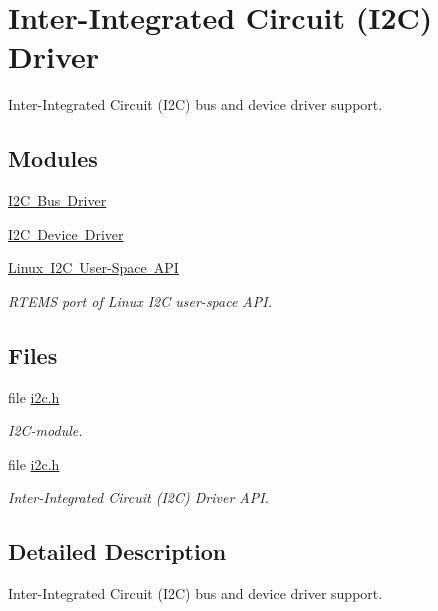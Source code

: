 \hypertarget{group__I2C}{}\section{Inter-\/\+Integrated Circuit (I2C) Driver}
\label{group__I2C}


Inter-\/\+Integrated Circuit (I2C) bus and device driver support.  


\subsection*{Modules}
\begin{DoxyCompactItemize}
\item 
\mbox{\hyperlink{group__I2CBus}{I2\+C Bus Driver}}
\item 
\mbox{\hyperlink{group__I2CDevice}{I2\+C Device Driver}}
\item 
\mbox{\hyperlink{group__I2CLinux}{Linux I2\+C User-\/\+Space A\+PI}}
\begin{DoxyCompactList}\small\item\em R\+T\+E\+MS port of Linux I2C user-\/space A\+PI. \end{DoxyCompactList}\end{DoxyCompactItemize}
\subsection*{Files}
\begin{DoxyCompactItemize}
\item 
file \mbox{\hyperlink{bsps_2arm_2stm32f4_2include_2bsp_2i2c_8h}{i2c.\+h}}
\begin{DoxyCompactList}\small\item\em I2\+C-\/module. \end{DoxyCompactList}\item 
file \mbox{\hyperlink{cpukit_2include_2dev_2i2c_2i2c_8h}{i2c.\+h}}
\begin{DoxyCompactList}\small\item\em Inter-\/\+Integrated Circuit (I2C) Driver A\+PI. \end{DoxyCompactList}\end{DoxyCompactItemize}


\subsection{Detailed Description}
Inter-\/\+Integrated Circuit (I2C) bus and device driver support. 

